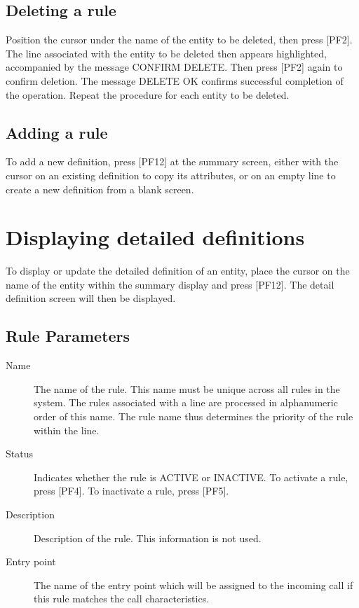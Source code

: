 \documentclass[letterpaper,10pt,english]{sphinxmanual}
\begin{document}
\subsection{Deleting a rule}
\label{\detokenize{connectivity_guide:deleting-a-rule}}
Position the cursor under the name of the entity to be deleted, then press {[}PF2{]}. The line associated with the entity to be deleted then appears highlighted, accompanied by the message CONFIRM DELETE. Then press {[}PF2{]} again to confirm deletion. The message DELETE OK confirms successful completion of the operation. Repeat the procedure for each entity to be deleted.


\subsection{Adding a rule}
\label{\detokenize{connectivity_guide:adding-a-rule}}
To add a new definition, press {[}PF12{]} at the summary screen, either with the cursor on an existing definition to copy its attributes, or on an empty line to create a new definition from a blank screen.


\section{Displaying detailed definitions}
\label{\detokenize{connectivity_guide:displaying-detailed-definitions}}
To display or update the detailed definition of an entity, place the cursor on the name of the entity within the summary display and press {[}PF12{]}. The detail definition screen will then be displayed.




\subsection{Rule Parameters}
\label{\detokenize{connectivity_guide:rule-parameters}}\begin{description}
\item[{Name}] \leavevmode
The name of the rule. This name must be unique across all rules in the system. The rules associated with a line are processed in alphanumeric order of this name. The rule name thus determines the priority of the rule within the line.

\item[{Status}] \leavevmode
Indicates whether the rule is ACTIVE or INACTIVE. To activate a rule, press {[}PF4{]}. To inactivate a rule, press {[}PF5{]}.

\item[{Description}] \leavevmode
Description of the rule. This information is not used.

\item[{Entry point}] \leavevmode
The name of the entry point which will be assigned to the incoming call if this rule matches the call characteristics.

\end{description}
\end{document}
